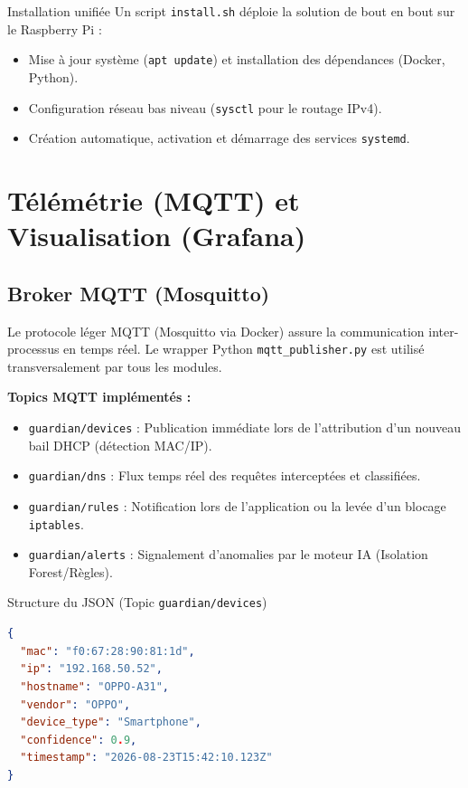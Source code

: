 \documentclass[11pt,a4paper]{article}
\begin{document}
\begin{choixcadre}{Installation unifiée}
Un script \texttt{install.sh} déploie la solution de bout en bout sur le Raspberry Pi :
\begin{itemize}
    \item Mise à jour système (\texttt{apt update}) et installation des dépendances (Docker, Python).
    \item Configuration réseau bas niveau (\texttt{sysctl} pour le routage IPv4).
    \item Création automatique, activation et démarrage des services \texttt{systemd}.
\end{itemize}
\end{choixcadre}

\section{Télémétrie (MQTT) et Visualisation (Grafana)}

\subsection{Broker MQTT (Mosquitto)}
Le protocole léger MQTT (Mosquitto via Docker) assure la communication inter-processus en temps réel. Le wrapper Python \texttt{mqtt\_publisher.py} est utilisé transversalement par tous les modules.

\textbf{Topics MQTT implémentés :}
\begin{itemize}
    \item \texttt{guardian/devices} : Publication immédiate lors de l'attribution d'un nouveau bail DHCP (détection MAC/IP).
    \item \texttt{guardian/dns} : Flux temps réel des requêtes interceptées et classifiées.
    \item \texttt{guardian/rules} : Notification lors de l'application ou la levée d'un blocage \texttt{iptables}.
    \item \texttt{guardian/alerts} : Signalement d'anomalies par le moteur IA (Isolation Forest/Règles).
\end{itemize}

\begin{stepcadre}{Structure du JSON (Topic \texttt{guardian/devices})}
\begin{lstlisting}[language=json]
{
  "mac": "f0:67:28:90:81:1d",
  "ip": "192.168.50.52",
  "hostname": "OPPO-A31",
  "vendor": "OPPO",
  "device_type": "Smartphone",
  "confidence": 0.9,
  "timestamp": "2026-08-23T15:42:10.123Z"
}
\end{lstlisting}
\end{stepcadre}
\end{document}

